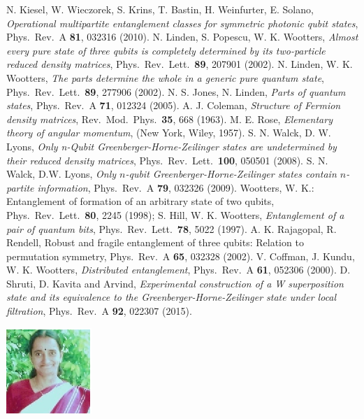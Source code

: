 \begin{thebibliography}{99}
 N. Kiesel, W. Wieczorek, S. Krins, T. Bastin, H. Weinfurter,  E. Solano, {\em Operational multipartite entanglement classes for symmetric photonic qubit states}, Phys.\ Rev.\ A {\bf 81}, 032316 (2010).
  N. Linden, S. Popescu, W. K. Wootters, {\em Almost every pure state of three qubits is completely determined by its two-particle reduced density matrices}, Phys.\ Rev.\ Lett.\  {\bf 89}, 207901 (2002).
 N. Linden, W. K.  Wootters, {\em The parts determine the whole in a generic pure quantum state}, Phys.\ Rev.\ Lett.\ {\bf 89}, 277906 (2002).
 N. S. Jones, N. Linden, {\em Parts of quantum states}, Phys.\ Rev.\ A {\bf 71}, 012324 (2005).
 A. J. Coleman, {\em Structure of Fermion density matrices}, Rev.\ Mod.\ Phys.\ {\bf 35}, 668 (1963). 
 M. E. Rose, {\em Elementary theory of angular momentum}, (New York, Wiley, 1957).  
 S. N. Walck, D. W. Lyons, {\em  Only n-Qubit Greenberger-Horne-Zeilinger states are undetermined by their reduced density matrices}, Phys.\  Rev.\ Lett.\ {\bf 100}, 050501 (2008).
 S. N. Walck, D.W. Lyons, {\em  Only $n$-qubit Greenberger-Horne-Zeilinger states contain $n$-partite information}, Phys.\ Rev.\ A {\bf 79}, 032326 (2009). 
  Wootters, W. K.: Entanglement of formation of an arbitrary state of two qubits, Phys.\ Rev.\ Lett.\ {\bf 80}, 2245 (1998); 
 S. Hill, W. K. Wootters,  {\em Entanglement of a pair of quantum bits}, Phys.\ Rev.\ Lett.\ {\bf 78},  5022 (1997).
  A. K. Rajagopal, R. Rendell, {\rm  Robust and fragile entanglement of three qubits: Relation to permutation symmetry}, Phys.\ Rev.\ A {\bf 65}, 032328 (2002). 
 V. Coffman, J. Kundu, W. K. Wootters, {\em Distributed entanglement}, Phys.\ Rev.\ A {\bf 61}, 052306 (2000).  
 D. Shruti, D. Kavita and Arvind, {\em Experimental construction of a W superposition state and its equivalence to the Greenberger-Horne-Zeilinger state under local filtration}, Phys.\ Rev.\ A {\bf 92}, 022307 (2015).  
\end{thebibliography}
\renewcommand{\thesection}{\arabic{section}}

\centerline{\includegraphics[scale=2]{authorsphotos/Prof_A_R_Sudha.eps}}
\medskip


